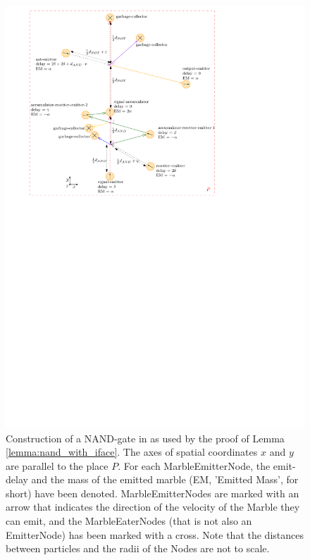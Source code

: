 \begin{figure}[h]
    \centering
    \includegraphics{figures/nand_with_interfaces_v6.pdf}
    \caption{Construction of a NAND-gate in \nenwin as used by the proof of Lemma \ref{lemma:nand_with_iface}. The axes of spatial coordinates $x$ and $y$ are parallel to the place $P$. For each MarbleEmitterNode, the emit-delay and the mass of the emitted marble (EM, 'Emitted Mass', for short) have been denoted. MarbleEmitterNodes are marked with an arrow that indicates the direction of the velocity of the Marble they can emit, and the MarbleEaterNodes (that is not also an EmitterNode) has been marked with a cross. Note that the distances between particles and the radii of the Nodes are not to scale.}
    \label{fig:nand_with_iface}
\end{figure}